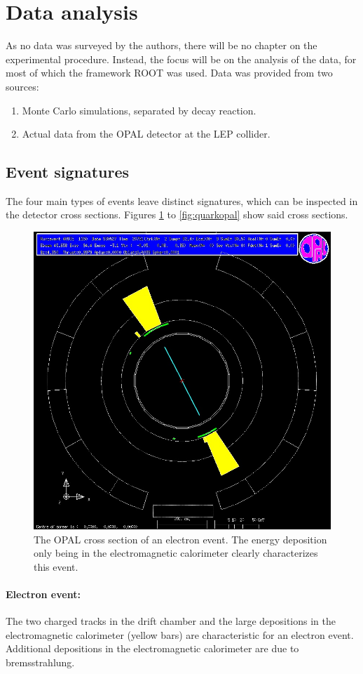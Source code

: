 \section{Data analysis}
As no data was surveyed by the authors, there will be no chapter on the experimental procedure. Instead, the focus will be on the analysis of the data, for most of which the framework ROOT was used. Data was provided from two sources:
\begin{enumerate}
	\item Monte Carlo simulations, separated by decay reaction.
	\item Actual data from the OPAL detector at the LEP collider.
\end{enumerate}

\subsection{Event signatures}
The four main types of events leave distinct signatures, which can be inspected in the detector cross sections. Figures \ref{fig:electronopal} to \ref{fig:quarkopal} show said cross sections. 

\begin{figure}[H]
\centering
\includegraphics[width=0.75\linewidth]{graphics/electronopal}
\caption[OPAL cross secion electron event]{The OPAL cross section of an electron event. The energy deposition only being in the electromagnetic calorimeter clearly characterizes this event.}
\label{fig:electronopal}
\end{figure}
\paragraph{Electron event:} The two charged tracks in the drift chamber and the large depositions in the electromagnetic calorimeter (yellow bars) are characteristic for an electron event. Additional depositions in the electromagnetic calorimeter are due to bremsstrahlung.

